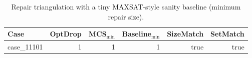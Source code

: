 \begin{table}[t]
\centering
\small
\begin{tabular}{lrrrrr}
\toprule
Case & OptDrop & MCS$_{\min}$ & Baseline$_{\min}$ & SizeMatch & SetMatch \\
\midrule
case\_11101 & 1 & 1 & 1 & true & true \\
\bottomrule
\end{tabular}
\caption{Repair triangulation with a tiny MAXSAT-style sanity baseline (minimum repair size).}
\label{tab:sen24-triangulation}
\end{table}
